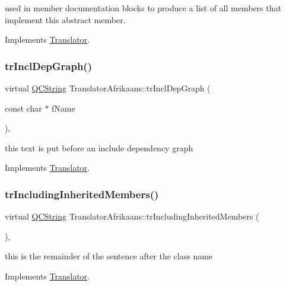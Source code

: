 used in member documentation blocks to produce a list of all members that implement this abstract member. 

Implements \mbox{\hyperlink{class_translator}{Translator}}.

\mbox{\label{class_translator_afrikaans_a24a573497cfae9b335bb4893d8d50256}} 
\subsubsection{\texorpdfstring{trInclDepGraph()}{trInclDepGraph()}}
{\footnotesize\ttfamily virtual \mbox{\hyperlink{class_q_c_string}{Q\+C\+String}} Translator\+Afrikaans\+::tr\+Incl\+Dep\+Graph (\begin{DoxyParamCaption}\item[{const char $\ast$}]{f\+Name }\end{DoxyParamCaption})\hspace{0.3cm}{\ttfamily [inline]}, {\ttfamily [virtual]}}

this text is put before an include dependency graph 

Implements \mbox{\hyperlink{class_translator}{Translator}}.

\mbox{\label{class_translator_afrikaans_abaa21b65f26b4f1f7e55c11ed1cea78a}} 
\subsubsection{\texorpdfstring{trIncludingInheritedMembers()}{trIncludingInheritedMembers()}}
{\footnotesize\ttfamily virtual \mbox{\hyperlink{class_q_c_string}{Q\+C\+String}} Translator\+Afrikaans\+::tr\+Including\+Inherited\+Members (\begin{DoxyParamCaption}{ }\end{DoxyParamCaption})\hspace{0.3cm}{\ttfamily [inline]}, {\ttfamily [virtual]}}

this is the remainder of the sentence after the class name 

Implements \mbox{\hyperlink{class_translator}{Translator}}.

